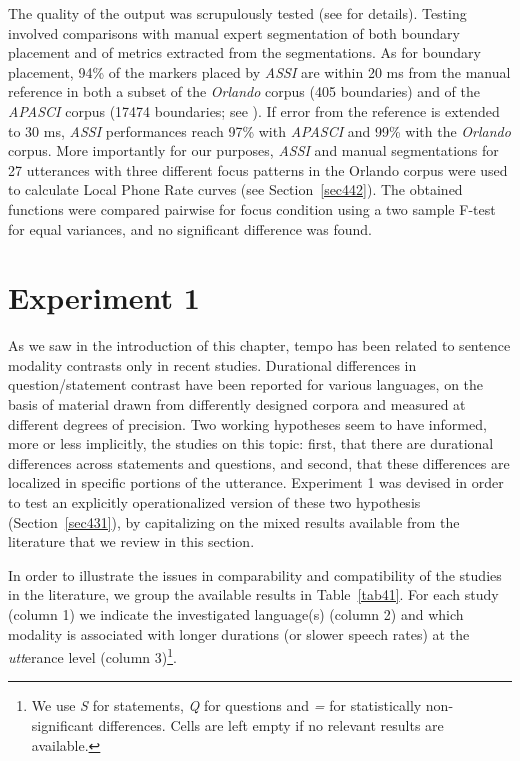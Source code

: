 The quality of the output was scrupulously tested (see \citealt{cangemi2011automatic} for details). Testing involved comparisons with manual expert segmentation of both boundary placement and of metrics extracted from the segmentations. As for boundary placement, 94\% of the markers placed by \textit{ASSI} are within 20 ms from the manual reference in both a subset of the \textit{Orlando} corpus (405 boundaries) and  of the \textit{APASCI} corpus (17474 boundaries; see \citealt{angelini1993baseline}). If error from the reference is extended to 30 ms, \textit{ASSI} performances reach 97\% with \textit{APASCI} and 99\% with the \textit{Orlando} corpus. More importantly for our purposes, \textit{ASSI} and manual segmentations for 27 utterances with three different focus patterns in the Orlando corpus were used to calculate Local Phone Rate curves (see Section~\ref{sec442}). The obtained functions were compared pairwise for focus condition using a two sample F-test for equal variances, and no significant difference was found.

\section{Experiment 1}\label{sec43}
As we saw in the introduction of this chapter, tempo has been related to sentence modality contrasts only in recent studies. Durational differences in question/statement contrast have been reported for various languages, on the basis of material drawn from differently designed corpora and measured at different degrees of precision. Two working hypotheses seem to have informed, more or less implicitly, the studies on this topic: first, that there are durational differences across statements and questions, and second, that these differences are localized in specific portions of the utterance. Experiment 1 was devised in order to test an explicitly operationalized version of these two hypothesis (Section~\ref{sec431}), by capitalizing on the mixed results available from the literature that we review in this section.

In order to illustrate the issues in comparability and compatibility of the studies in the literature, we group the available results in Table~\ref{tab41}. For each study (column 1) we indicate the investigated language(s) (column 2) and which modality is associated with longer durations (or slower speech rates) at the \textit{utt}erance level (column 3)\footnote{We use \textit{S} for statements, \textit{Q} for questions and \textit{=} for statistically non-significant differences. Cells are left empty if no relevant results are available.}. 

